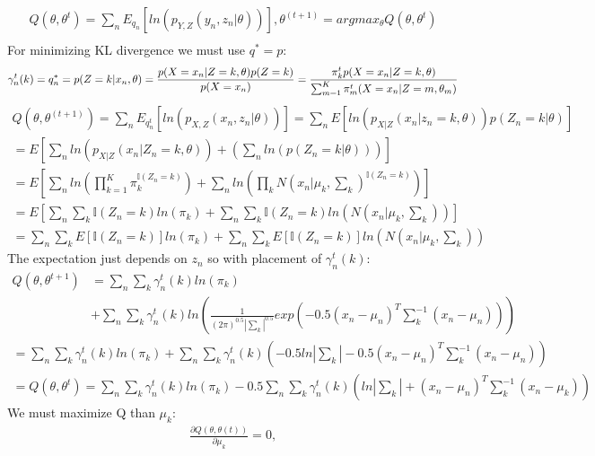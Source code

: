 \documentclass[12pt]{article}
\begin{document}
\begin{qsolve}[solution]
    \begin{gather*}
        Q(\theta,\theta^t)=\sum_{n}E_{q_n}[ln(p_{Y,Z}(y_n,z_n|\theta))],\theta^{(t+1)}=argmax_\theta Q(\theta,\theta^t) \\
    \end{gather*}
    For minimizing KL divergence we must use $q^*=p$:
    \begin{equation*}
        \gamma_n^t(k)=q_n^*=p(Z=k|x_n,\theta)=\frac{p(X=x_n|Z=k,\theta)p(Z=k)}{p(X=x_n)}\\
        =\frac{\pi_k^tp(X=x_n|Z=k,\theta)}{\sum_{m=1}^K\pi_m^t(X=x_n|Z=m,\theta_m)}
    \end{equation*}
    \splitqsolve
    \begin{gather*}
        Q(\theta,\theta^{(t+1)})=\sum_nE_{q_n^t}[ln(p_{X,Z}(x_n,z_n|\theta))]=\sum_n E[ln(p_{X|Z}(x_n|z_n=k,\theta))p(Z_n=k|\theta)] \\
        = E[\sum_nln(p_{X|Z}(x_n|Z_n=k,\theta))+(\sum_nln(p(Z_n=k|\theta)))]  \\
        = E[\sum_nln(\prod_{k=1}^K\pi_k^{\mathbb{I}(Z_n=k)})+\sum_nln(\prod_kN(x_n|\mu_k,\sum_k)^{\mathbb{I}(Z_n=k)})] \\
        = E[\sum_n\sum_k{\mathbb{I}(Z_n=k)}ln(\pi_k)+\sum_n\sum_k{\mathbb{I}(Z_n=k)}ln(N(x_n|\mu_k,\sum_k))] \\
        = \sum_n\sum_kE[{\mathbb{I}(Z_n=k)}]ln(\pi_k)+\sum_n\sum_kE[{\mathbb{I}(Z_n=k)}]ln(N(x_n|\mu_k,\sum_k))
    \end{gather*}
    The expectation just depends on $z_n$ so with placement of $\gamma_n^t(k)$:
    \begin{align*}
        Q(\theta,\theta^{t+1}) & =\sum_n\sum_k\gamma_n^t(k)ln(\pi_k)                                                                             \\
                               & + \sum_n\sum_k\gamma_n^t(k)ln(\frac{1}{(2\pi)^{0.5}|\sum_k|^{0.5}}exp(-0.5(x_n-\mu_n)^T\sum_k^{-1}(x_n-\mu_n)))
    \end{align*}
    \begin{gather*}
        =\sum_n\sum_k\gamma_n^t(k)ln(\pi_k)+\sum_n\sum_k\gamma_n^t(k)(-0.5ln|\sum_k|-0.5(x_n-\mu_n)^T\sum_k^{-1}(x_n-\mu_n)) \\
        = Q(\theta,\theta^t)=\sum_n\sum_k\gamma_n^t(k)ln(\pi_k)-0.5\sum_n\sum_k\gamma_n^t(k)(ln|\sum_k|+(x_n-\mu_n)^T\sum_k^{-1}(x_n-\mu_k))
    \end{gather*}
    We must maximize Q than $\mu_k$:
    \begin{gather*}
        \frac{\partial Q(\theta,\theta(t))}{\partial \mu_k}=0,\\

\end{gather*}
\end{qsolve}
\end{document}
